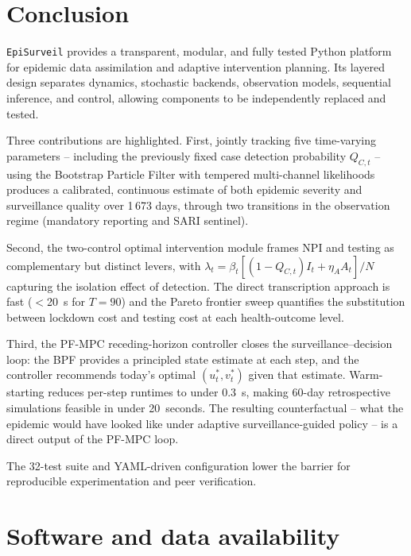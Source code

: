 \documentclass[11pt]{article}
\begin{document}
\section{Conclusion}
\label{sec:conclusion}

\texttt{EpiSurveil} provides a transparent, modular, and fully tested
Python platform for epidemic data assimilation and adaptive intervention
planning.
Its layered design separates dynamics, stochastic backends, observation
models, sequential inference, and control, allowing components to be
independently replaced and tested.

Three contributions are highlighted.
First, jointly tracking five time-varying parameters -- including the
previously fixed case detection probability $Q_{C,t}$ -- using the
Bootstrap Particle Filter with tempered multi-channel likelihoods
produces a calibrated, continuous estimate of both epidemic severity and
surveillance quality over 1\,673 days, through two transitions in the
observation regime (mandatory reporting and SARI sentinel).

Second, the two-control optimal intervention module frames NPI and
testing as complementary but distinct levers, with
$\lambda_t=\beta_t[(1-Q_{C,t})I_t+\eta_A A_t]/N$ capturing the
isolation effect of detection.
The direct transcription approach is fast ($<$20~s for $T=90$) and
the Pareto frontier sweep quantifies the substitution between lockdown
cost and testing cost at each health-outcome level.

Third, the PF-MPC receding-horizon controller closes the
surveillance--decision loop: the BPF provides a principled state
estimate at each step, and the controller recommends today's optimal
$(u^*_t, v^*_t)$ given that estimate.
Warm-starting reduces per-step runtimes to under 0.3~s, making
60-day retrospective simulations feasible in under 20~seconds.
The resulting counterfactual -- what the epidemic would have looked
like under adaptive surveillance-guided policy -- is a direct output
of the PF-MPC loop.

The 32-test suite and YAML-driven configuration lower the barrier for
reproducible experimentation and peer verification.


\section*{Software and data availability}
\end{document}
